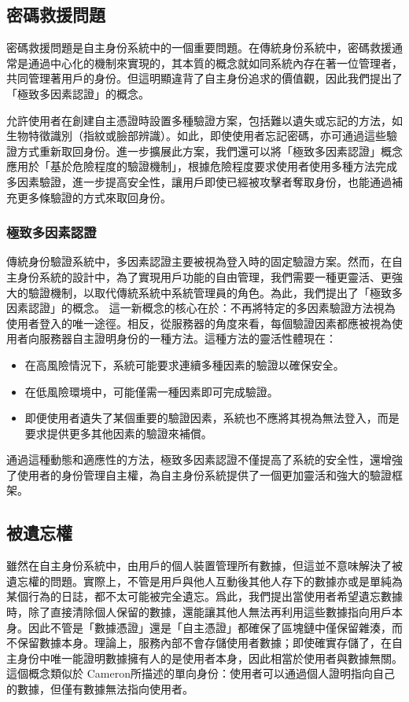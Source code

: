 \subsection{密碼救援問題}
密碼救援問題是自主身份系統中的一個重要問題。在傳統身份系統中，密碼救援通常是通過中心化的機制來實現的，其本質的概念就如同系統內存在著一位管理者，共同管理著用戶的身份。但這明顯違背了自主身份追求的價值觀，因此我們提出了「極致多因素認證」的概念。

允許使用者在創建自主憑證時設置多種驗證方案，包括難以遺失或忘記的方法，如生物特徵識別（指紋或臉部辨識）。如此，即使使用者忘記密碼，亦可通過這些驗證方式重新取回身份。進一步擴展此方案，我們還可以將「極致多因素認證」概念應用於「基於危險程度的驗證機制」，根據危險程度要求使用者使用多種方法完成多因素驗證，進一步提高安全性，讓用戶即使已經被攻擊者奪取身份，也能通過補充更多條驗證的方式來取回身份。
\subsubsection{極致多因素認證}
傳統身份驗證系統中，多因素認證主要被視為登入時的固定驗證方案。然而，在自主身份系統的設計中，為了實現用戶功能的自由管理，我們需要一種更靈活、更強大的驗證機制，以取代傳統系統中系統管理員的角色。為此，我們提出了「極致多因素認證」的概念。
這一新概念的核心在於：不再將特定的多因素驗證方法視為使用者登入的唯一途徑。相反，從服務器的角度來看，每個驗證因素都應被視為使用者向服務器自主證明身份的一種方法。這種方法的靈活性體現在：
\begin{itemize}
  \item 在高風險情況下，系統可能要求連續多種因素的驗證以確保安全。
  \item 在低風險環境中，可能僅需一種因素即可完成驗證。
  \item 即便使用者遺失了某個重要的驗證因素，系統也不應將其視為無法登入，而是要求提供更多其他因素的驗證來補償。
\end{itemize}
通過這種動態和適應性的方法，極致多因素認證不僅提高了系統的安全性，還增強了使用者的身份管理自主權，為自主身份系統提供了一個更加靈活和強大的驗證框架。
\subsection{被遺忘權}
雖然在自主身份系統中，由用戶的個人裝置管理所有數據，但這並不意味解決了被遺忘權的問題。實際上，不管是用戶與他人互動後其他人存下的數據亦或是單純為某個行為的日誌，都不太可能被完全遺忘。爲此，我們提出當使用者希望遺忘數據時，除了直接清除個人保留的數據，還能讓其他人無法再利用這些數據指向用戶本身。因此不管是「數據憑證」還是「自主憑證」都確保了區塊鏈中僅保留雜湊，而不保留數據本身。理論上，服務內部不會存儲使用者數據；即使確實存儲了，在自主身份中唯一能證明數據擁有人的是使用者本身，因此相當於使用者與數據無關。這個概念類似於 Cameron\cite{cameron2005laws}所描述的單向身份：使用者可以通過個人證明指向自己的數據，但僅有數據無法指向使用者。

